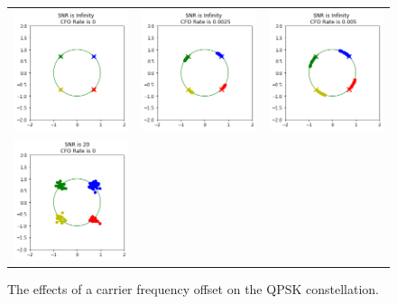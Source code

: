 \setlength{\tabcolsep}{0pt}
\begin{figure}
  \centering
  \caption{The effects of a carrier frequency offset on the QPSK constellation.}
  \begin{tabular}{ccc}
    \includegraphics[width=50mm]{figures/cfo_intro/snr_0/cfo_0.png}&
    \includegraphics[width=50mm]{figures/cfo_intro/snr_0/cfo_1.png}&
    \includegraphics[width=50mm]{figures/cfo_intro/snr_0/cfo_2.png}\\
    \includegraphics[width=50mm]{figures/cfo_intro/snr_20/cfo_0.png}&

\end{tabular}
\end{figure}
